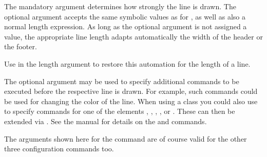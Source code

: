 The mandatory argument  determines how strongly the
line is drawn. The optional argument  accepts the same
symbolic values as  for , as well as
also a normal length expression.  As long as the optional argument
 is not assigned a value, the appropriate line length
adapts automatically the width of the header or the footer.

Use  in the length argument to restore this automation
for the length of a line.

\BeginIndexGroup
{}%
%
%
%
%
The optional argument  may
be used to specify additional commands to be executed before the respective
line is drawn.  For example, such commands could be used for changing the
color%
%
 of the line.  When using a
{\KOMAScript} class you could also use
 to specify commands for one of the
elements , ,
, , or
.  These can then be extended via
.  See the \KOMAScript{} manual
for details on the  and  commands.
\EndIndexGroup


\begin{Declaration}
                        \Parameter{}%
                        \Parameter{}\OParameter{}
\end{Declaration}%
The arguments shown here for the command  are of
course valid for the other three configuration commands too.

